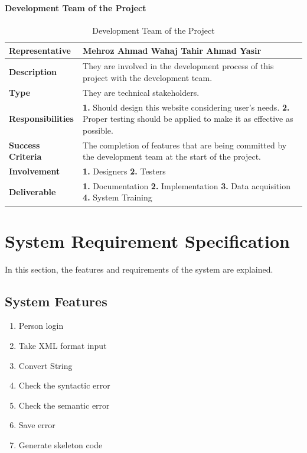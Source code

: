 \documentclass[12pt,a4paper]{article}
\begin{document}
\paragraph{Development Team of the Project}
\begin{table}[h!]
\caption{Development Team of the Project}
    \centering
    \begin{tabular}{|l|p{7cm}|}
    \hline
       \textbf{Representative}&\textbf{Mehroz Ahmad}
\newline\textbf{Wahaj Tahir}
\newline\textbf{Ahmad Yasir} \\%
\hline
\textbf{Description}&They are involved in the development process of this project with the
development team. \\%
\hline
\textbf{Type}&They are technical stakeholders.\\%
\hline
\textbf{Responsibilities}&
\newline\textbf{1.} Should design this website considering user’s needs.
\newline\textbf{2.} Proper testing should be applied to make it as effective as possible.\\%
\hline
\textbf{Success Criteria}&The completion of features that are being committed by the development team at the start of the project.\\%
\hline
\textbf{Involvement}&\textbf{1.} Designers
\newline\textbf{2.} Testers\\%
\hline
\textbf{Deliverable}&
\textbf{1.} Documentation
\newline\textbf{2.} Implementation
\newline\textbf{3.} Data acquisition
\newline\textbf{4.} System Training \\%
\hline
    \end{tabular}
\end{table}

\section{System Requirement Specification}
In this section, the features and requirements of the system are explained.
\subsection{System Features}
\begin{enumerate}
    \item Person login
    \item Take XML format input
    \item Convert String
    \item Check the syntactic error
    \item Check the semantic  error
    \item Save error
    \item Generate skeleton code
    
\end{enumerate}
\end{document}
